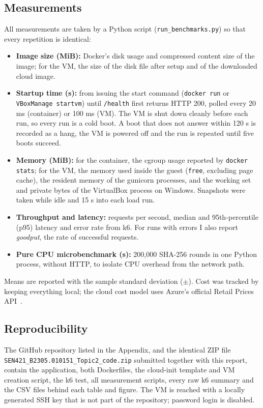 \documentclass[conference,a4paper]{IEEEtran}
\begin{document}
\subsection{Measurements}

All measurements are taken by a Python script (\texttt{run\_benchmarks.py}) so that every repetition is identical:
\begin{itemize}
	\item \textbf{Image size (MiB):} Docker's disk usage and compressed content size of the image; for the VM, the size of the disk file after setup and of the downloaded cloud image.
	\item \textbf{Startup time (s):} from issuing the start command (\texttt{docker run} or \texttt{VBoxManage startvm}) until \texttt{/health} first returns HTTP 200, polled every 20 ms (container) or 100 ms (VM). The VM is shut down cleanly before each run, so every run is a cold boot. A boot that does not answer within 120 s is recorded as a hang, the VM is powered off and the run is repeated until five boots succeed.
	\item \textbf{Memory (MiB):} for the container, the cgroup usage reported by \texttt{docker stats}; for the VM, the memory used inside the guest (\texttt{free}, excluding page cache), the resident memory of the gunicorn processes, and the working set and private bytes of the VirtualBox process on Windows. Snapshots were taken while idle and 15 s into each load run.
	\item \textbf{Throughput and latency:} requests per second, median and 95th-percentile (p95) latency and error rate from k6. For runs with errors I also report \emph{goodput}, the rate of successful requests.
	\item \textbf{Pure CPU microbenchmark (s):} 200{,}000 SHA-256 rounds in one Python process, without HTTP, to isolate CPU overhead from the network path.
\end{itemize}
Means are reported with the sample standard deviation ($\pm$). Cost was tracked by keeping everything local; the cloud cost model uses Azure's official Retail Prices API~\cite{azureprices}.

\subsection{Reproducibility}

The GitHub repository listed in the Appendix, and the identical ZIP file \texttt{SEN421\_B2305.010151\_Topic2\_code.zip} submitted together with this report, contain the application, both Dockerfiles, the cloud-init template and VM creation script, the k6 test, all measurement scripts, every raw k6 summary and the CSV files behind each table and figure. The VM is reached with a locally generated SSH key that is not part of the repository; password login is disabled.
\end{document}
